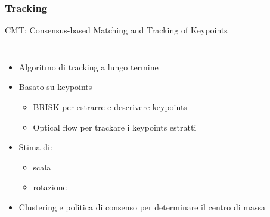 \documentclass[c]{beamer}
\begin{document}

\begin{frame}
\frametitle{Tracking}

CMT: Consensus-based Matching and Tracking of Keypoints
\begin{columns}[c, onlytextwidth]
\begin{itemize}
 \item Algoritmo di tracking a lungo termine
 \item Basato su keypoints
 \begin{itemize}
  \item BRISK per estrarre e descrivere keypoints
  \item Optical flow per trackare i keypoints estratti
 \end{itemize}
 \item Stima di:
  \begin{itemize}
  \item scala
  \item rotazione
 \end{itemize}
 \item Clustering e politica di consenso per determinare il centro di massa

\end{itemize}
 \\
\vskip 0.5cm

\end{columns}
\end{frame}
\end{document}
